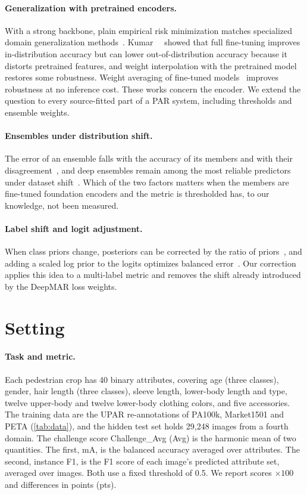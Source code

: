 \documentclass[10pt,twocolumn,letterpaper]{article}
\begin{document}
\paragraph{Generalization with pretrained encoders.} With a strong backbone, plain empirical risk minimization matches specialized domain generalization methods~\cite{domainbed}. Kumar~\etal~\cite{lpft} showed that full fine-tuning improves in-distribution accuracy but can lower out-of-distribution accuracy because it distorts pretrained features, and weight interpolation with the pretrained model~\cite{wiseft} restores some robustness. Weight averaging of fine-tuned models~\cite{soups,diwa} improves robustness at no inference cost. These works concern the encoder. We extend the question to every source-fitted part of a PAR system, including thresholds and ensemble weights.

\paragraph{Ensembles under distribution shift.} The error of an ensemble falls with the accuracy of its members and with their disagreement~\cite{krogh}, and deep ensembles remain among the most reliable predictors under dataset shift~\cite{deepens,ovadia}. Which of the two factors matters when the members are fine-tuned foundation encoders and the metric is thresholded has, to our knowledge, not been measured.

\paragraph{Label shift and logit adjustment.} When class priors change, posteriors can be corrected by the ratio of priors~\cite{saerens,lipton}, and adding a scaled log prior to the logits optimizes balanced error~\cite{logitadj}. Our correction applies this idea to a multi-label metric and removes the shift already introduced by the DeepMAR loss weights.

\section{Setting}
\label{sec:setting}

\paragraph{Task and metric.} Each pedestrian crop has 40 binary attributes, covering age (three classes), gender, hair length (three classes), sleeve length, lower-body length and type, twelve upper-body and twelve lower-body clothing colors, and five accessories. The training data are the UPAR re-annotations of PA100k, Market1501 and PETA (\cref{tab:data}), and the hidden test set holds 29{,}248 images from a fourth domain. The challenge score Challenge\_Avg (Avg) is the harmonic mean of two quantities. The first, mA, is the balanced accuracy averaged over attributes. The second, instance F1, is the F1 score of each image's predicted attribute set, averaged over images. Both use a fixed threshold of 0.5. We report scores $\times100$ and differences in points (pts).
\end{document}
